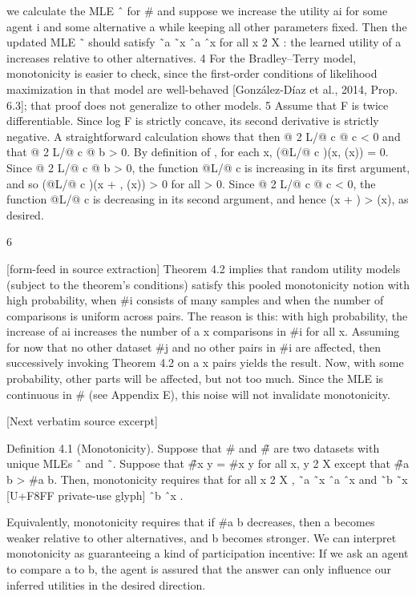 \documentclass[10pt]{article}
\begin{document}
\begin{ReviewVerbatim}
we calculate the MLE ˆ for # and suppose we increase the utility ai for some agent i and some
alternative a while keeping all other parameters fixed. Then the updated MLE ˜ should satisfy
 ˜a ˜x       ˆa ˆx for all x 2 X : the learned utility of a increases relative to other alternatives.
    4
      For the Bradley–Terry model, monotonicity is easier to check, since the first-order conditions of likelihood
maximization in that model are well-behaved [González-Díaz et al., 2014, Prop. 6.3]; that proof does not
generalize to other models.
    5
      Assume that F is twice differentiable. Since log F is strictly concave, its second derivative is strictly
negative. A straightforward calculation shows that then @ 2 L/@ c @ c < 0 and that @ 2 L/@ c @ b > 0. By
definition of , for each x, (@L/@ c )(x, (x)) = 0. Since @ 2 L/@ c @ b > 0, the function @L/@ c is
increasing in its first argument, and so (@L/@ c )(x + , (x)) > 0 for all > 0. Since @ 2 L/@ c @ c < 0,
the function @L/@ c is decreasing in its second argument, and hence (x + ) > (x), as desired.


                                                                                        6

[form-feed in source extraction]
Theorem 4.2 implies that random utility models (subject to the theorem’s conditions) satisfy this
pooled monotonicity notion with high probability, when #i consists of many samples and when the
number of comparisons is uniform across pairs. The reason is this: with high probability, the increase
of ai increases the number of a x comparisons in #i for all x. Assuming for now that no other
dataset #j and no other pairs in #i are affected, then successively invoking Theorem 4.2 on a x
pairs yields the result. Now, with some probability, other parts will be affected, but not too much.
Since the MLE is continuous in # (see Appendix E), this noise will not invalidate monotonicity.

[Next verbatim source excerpt]

Definition 4.1 (Monotonicity). Suppose that # and #̃ are two datasets with unique MLEs ˆ and ˜.
Suppose that #̃{x y} = #{x y} for all x, y 2 X except that #̃{a                   b} > #{a     b}. Then,
monotonicity requires that for all x 2 X ,
                           ˜a     ˜x   ˆa    ˆx    and    ˜b    ˜x [U+F8FF private-use glyph] ˆb    ˆx .

Equivalently, monotonicity requires that if #{a b} decreases, then a becomes weaker relative to
other alternatives, and b becomes stronger. We can interpret monotonicity as guaranteeing a kind of
participation incentive: If we ask an agent to compare a to b, the agent is assured that the answer can
only influence our inferred utilities in the desired direction.



\end{ReviewVerbatim}
\end{document}
